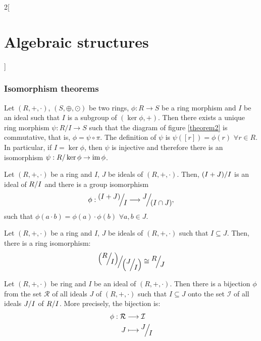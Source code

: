 \documentclass[../../../main.tex]{subfiles}
\begin{document}
\begin{multicols}{2}[\section{Algebraic structures}]
\subsubsection{Isomorphism theorems}
\begin{theorem}
    Let $(R,+,\cdot)$, $(S,\oplus,\odot)$ be two rings, $\phi:R\rightarrow S$ be a ring morphism and $I$ be an ideal such that $I$ is a subgroup of $(\ker\phi,+)$. Then there exists a unique ring morphism $\psi:R/I\rightarrow S$ such that the diagram of figure \ref{theorem2} is commutative, that is, $\phi=\psi\circ\pi$.
    The definition of $\psi$ is $\psi([r])=\phi(r)$ $\forall r\in R$.
    In particular, if $I=\ker\phi$, then $\psi$ is injective and therefore there is an isomorphism $\psi:R/\ker\phi\rightarrow\operatorname{im}\phi$.
\end{theorem}
\begin{theorem}
    Let $(R,+,\cdot)$ be a ring and $I$, $J$ be ideals of $(R,+,\cdot)$. Then, $\quot{(I+J)}{I}$ is an ideal of $\quot{R}{I}$ and there is a group isomorphism 
    $$\phi:\quot{(I+J)}{I}\longrightarrow\quot{J}{(I\cap J)},$$ such that $\phi(a\cdot b)=\phi(a)\cdot\phi(b)$ $\forall a,b\in J$.
\end{theorem}
\begin{theorem}
    Let $(R,+,\cdot)$ be a ring and $I$, $J$ be ideals of $(R,+,\cdot)$ such that $I\subseteq J$. Then, there is a ring isomorphism: 
    $$\quot{\left(\quot{R}{I}\right)}{\left(\quot{J}{I}\right)}\cong\quot{R}{J}$$
\end{theorem}
\begin{theorem}
    Let $(R,+,\cdot)$ be ring and $I$ be an ideal of $(R,+,\cdot)$. Then there is a bijection $\phi$ from the set $\mathcal{R}$ of all ideals $J$ of $(R,+,\cdot)$ such that $I\subseteq J$ onto the set $\mathcal{I}$ of all ideals $\quot{J}{I}$ of $\quot{R}{I}$. More precisely, the bijection is:
    \begin{align*}
        \phi:\mathcal{R}&\longrightarrow\mathcal{I}\\
        J&\longmapsto\quot{J}{I}
    \end{align*}
\end{theorem}

\end{multicols}
\end{document}
